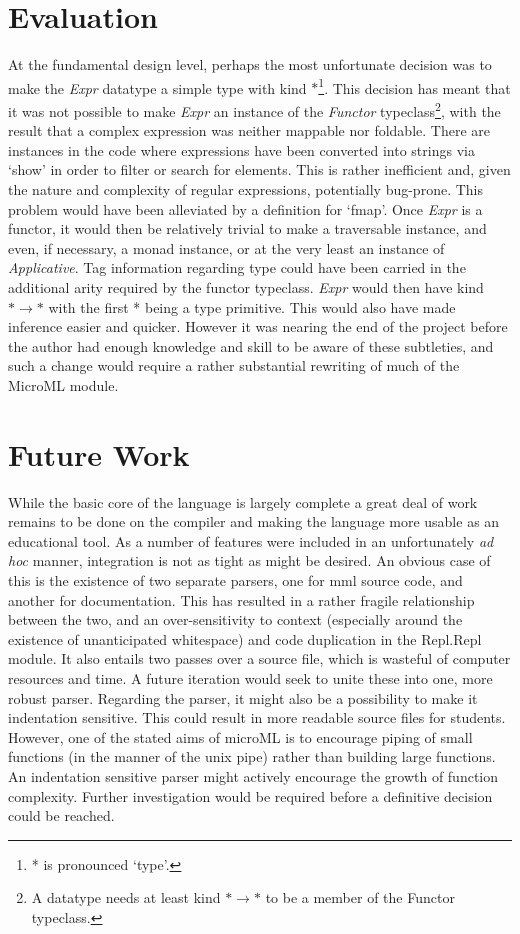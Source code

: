 \documentclass[12pt, a4paper]{report}
\begin{document}
\section{Evaluation}
At the fundamental design level, perhaps the most unfortunate decision was to make the \textit{Expr}
datatype a simple type with kind $*$\footnote{* is pronounced `type'.}. This decision has meant that
it was not possible to make \textit{Expr} an instance of the \textit{Functor} typeclass\footnote{A
datatype needs at least kind $* \rightarrow *$ to be a member of the Functor typeclass.}, with the
result that a complex expression was neither mappable nor foldable. There are instances in the code
where expressions have been converted into strings via `show' in order to filter or search for
elements. This is rather inefficient and, given the nature and complexity of regular expressions,
potentially bug-prone. This problem would have been alleviated by a definition for `fmap'. Once
\textit{Expr} is a functor, it would then be relatively trivial to make a traversable instance, and
even, if necessary, a monad instance, or at the very least an instance of \textit{Applicative}.
Tag information regarding type could have been carried in the additional arity required by the
functor typeclass. \textit{Expr} would then have kind $* \rightarrow *$ with the first * being a
type primitive. This would also have made inference easier and quicker. However it was nearing the
end of the project before the author had enough knowledge and skill to be aware of these subtleties,
and such a change would require a rather substantial rewriting of much of the MicroML module.

\section{Future Work}
While the basic core of the language is largely complete a great deal of work remains to be done on
the compiler and making the language more usable as an educational tool. As a number of features
were included in an unfortunately \textit{ad hoc} manner, integration is not as tight as might be
desired. An obvious case of this is the existence of two separate parsers, one for mml source code,
and another for documentation. This has resulted in a rather fragile relationship between the two,
and an over-sensitivity to context (especially around the existence of unanticipated whitespace)
and code duplication in the Repl.Repl module. It also entails two passes over a source file, which
is wasteful of computer resources and time. A future iteration would seek to unite these into one,
more robust parser. Regarding the parser, it might also be a possibility to make it indentation
sensitive. This could result in more readable source files for students. However, one of the stated
aims of microML is to encourage piping of small functions (in the manner of the unix pipe) rather
than building large functions. An indentation sensitive parser might actively encourage the growth
of function complexity. Further investigation would be required before a definitive decision could
be reached.
\end{document}
